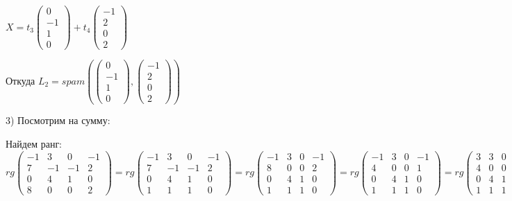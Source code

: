\documentclass{article}
\begin{document}
$X = t_3\begin{pmatrix}
    0\\
    -1\\
    1\\
    0
\end{pmatrix}  + t_4 \begin{pmatrix}
    -1\\
    2\\
    0\\
    2
\end{pmatrix}$

Откуда $L_2  = spam(\begin{pmatrix}
    0\\
    -1\\
    1\\
    0
\end{pmatrix}, \begin{pmatrix}
    -1\\
    2\\
    0\\
    2
\end{pmatrix})$

3) Посмотрим на сумму:

Найдем ранг: $rg \begin{pmatrix}
    -1 & 3 & 0 & -1 \\
    7 & -1 & -1 & 2 \\
    0 & 4 & 1 & 0 \\
    8 & 0 & 0 & 2
\end{pmatrix} = rg \begin{pmatrix}
    -1 & 3 & 0 & -1 \\
    7 & -1 & -1 & 2 \\
    0 & 4 & 1 & 0 \\
    1 & 1 & 1 & 0
\end{pmatrix}  =rg \begin{pmatrix}
    -1 & 3 & 0 & -1 \\
    8 & 0 & 0 & 2 \\
    0 & 4 & 1 & 0 \\
    1 & 1 & 1 & 0
\end{pmatrix}=rg \begin{pmatrix}
    -1 & 3 & 0 & -1 \\
    4 & 0 & 0 & 1 \\
    0 & 4 & 1 & 0 \\
    1 & 1 & 1 & 0
\end{pmatrix}=rg \begin{pmatrix}
    3 & 3 & 0 & 0 \\
    4 & 0 & 0 & 1 \\
    0 & 4 & 1 & 0 \\
    1 & 1 & 1 & 0
\end{pmatrix}=rg \begin{pmatrix}
    1 & 1 & 0 & 0 \\
    4 & 0 & 0 & 1 \\
    0 & 4 & 1 & 0 \\
    0 & 0 & 1 & 0
\end{pmatrix} = 4 $
\end{document}
